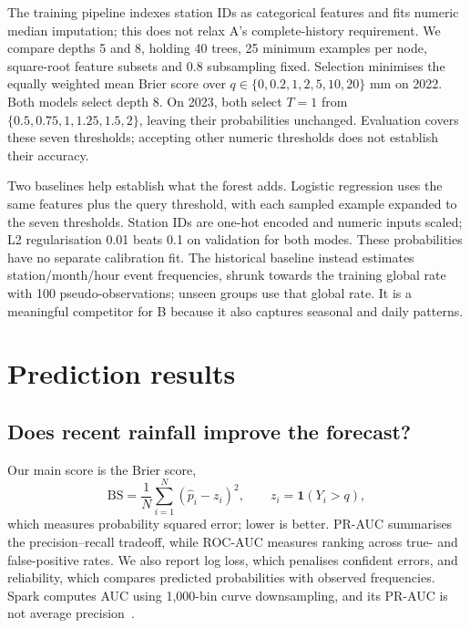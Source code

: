 The training pipeline indexes station IDs as categorical features and fits numeric median imputation; this does not relax A's complete-history requirement. We compare depths 5 and 8, holding 40 trees, 25 minimum examples per node, square-root feature subsets and 0.8 subsampling fixed. Selection minimises the equally weighted mean Brier score over $q\in\{0,0.2,1,2,5,10,20\}$ mm on 2022. Both models select depth 8. On 2023, both select $T=1$ from $\{0.5,0.75,1,1.25,1.5,2\}$, leaving their probabilities unchanged. Evaluation covers these seven thresholds; accepting other numeric thresholds does not establish their accuracy.

Two baselines help establish what the forest adds. Logistic regression uses the same features plus the query threshold, with each sampled example expanded to the seven thresholds. Station IDs are one-hot encoded and numeric inputs scaled; L2 regularisation 0.01 beats 0.1 on validation for both modes. These probabilities have no separate calibration fit. The historical baseline instead estimates station/month/hour event frequencies, shrunk towards the training global rate with 100 pseudo-observations; unseen groups use that global rate. It is a meaningful competitor for B because it also captures seasonal and daily patterns.

\section{Prediction results}
\subsection{Does recent rainfall improve the forecast?}
Our main score is the Brier score,
\[
\mathrm{BS}=\frac{1}{N}\sum_{i=1}^{N}(\widehat p_i-z_i)^2,
\qquad z_i=\mathbf1(Y_i>q),
\]
which measures probability squared error; lower is better. PR-AUC summarises the precision--recall tradeoff, while ROC-AUC measures ranking across true- and false-positive rates. We also report log loss, which penalises confident errors, and reliability, which compares predicted probabilities with observed frequencies. Spark computes AUC using 1,000-bin curve downsampling, and its PR-AUC is not average precision~\cite{sparkeval}.

